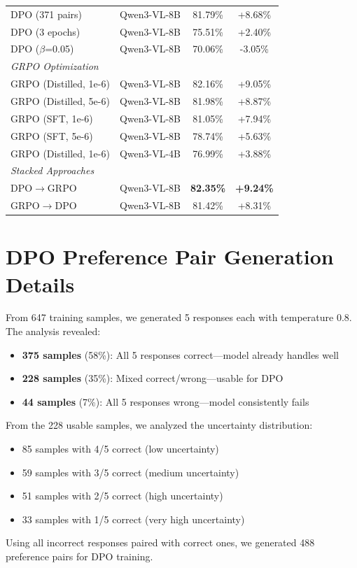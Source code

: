 \documentclass[11pt,a4paper]{article}
\begin{document}
\begin{table}[h]
\begin{tabular}{llcc}
DPO (371 pairs) & Qwen3-VL-8B & 81.79\% & +8.68\% \\
DPO (3 epochs) & Qwen3-VL-8B & 75.51\% & +2.40\% \\
DPO ($\beta$=0.05) & Qwen3-VL-8B & 70.06\% & -3.05\% \\
\midrule
\multicolumn{4}{l}{\textit{GRPO Optimization}} \\
GRPO (Distilled, 1e-6) & Qwen3-VL-8B & 82.16\% & +9.05\% \\
GRPO (Distilled, 5e-6) & Qwen3-VL-8B & 81.98\% & +8.87\% \\
GRPO (SFT, 1e-6) & Qwen3-VL-8B & 81.05\% & +7.94\% \\
GRPO (SFT, 5e-6) & Qwen3-VL-8B & 78.74\% & +5.63\% \\
GRPO (Distilled, 1e-6) & Qwen3-VL-4B & 76.99\% & +3.88\% \\
\midrule
\multicolumn{4}{l}{\textit{Stacked Approaches}} \\
DPO$\rightarrow$GRPO & Qwen3-VL-8B & \textbf{82.35\%} & \textbf{+9.24\%} \\
GRPO$\rightarrow$DPO & Qwen3-VL-8B & 81.42\% & +8.31\% \\
\bottomrule
\end{tabular}
\end{table}

\section{DPO Preference Pair Generation Details}

From 647 training samples, we generated 5 responses each with temperature 0.8. The analysis revealed:

\begin{itemize}
    \item \textbf{375 samples} (58\%): All 5 responses correct---model already handles well
    \item \textbf{228 samples} (35\%): Mixed correct/wrong---usable for DPO
    \item \textbf{44 samples} (7\%): All 5 responses wrong---model consistently fails
\end{itemize}

From the 228 usable samples, we analyzed the uncertainty distribution:
\begin{itemize}
    \item 85 samples with 4/5 correct (low uncertainty)
    \item 59 samples with 3/5 correct (medium uncertainty)
    \item 51 samples with 2/5 correct (high uncertainty)
    \item 33 samples with 1/5 correct (very high uncertainty)
\end{itemize}

Using all incorrect responses paired with correct ones, we generated 488 preference pairs for DPO training.
\end{document}
